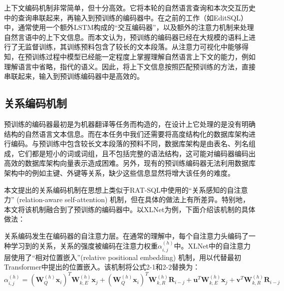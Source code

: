 上下文编码机制非常简单，但十分高效。它将本轮的自然语言查询和本次交互历史中的查询串联起来，再输入到预训练的编码器中。在之前的工作（如EditSQL\cite{edit19}）中，通常使用一个额外LSTM构成的“交互编码器”，以及额外的注意力机制来处理自然言语中的上下文信息。而本文认为，预训练的编码器已经在大规模的语料上进行了无监督训练，其训练预料包含了较长的文本段落。从注意力可视化\cite{attn17}中能够得知，在预训练过程中模型已经能一定程度上掌握理解自然语言上下文的能力，例如理解语言中省略，指代的语义。因此，将上下文信息按照匹配预训练的方法，直接串联起来，输入到预训练编码器中是高效的。

\subsection{关系编码机制}

预训练的编码器最初是为机器翻译等任务而构造的，在设计上它处理的是没有明确结构的自然语言文本信息。而在本任务中我们还需要将高度结构化的数据库架构进行编码。与预训练中包含较长文本段落的预料不同，数据库架构是由表名、列名组成，它们都是短小的词或词组，且不包括完整的语法结构，这可能对编码器编码出高效的数据库架构向量表示造成困难。另外，现有的预训练编码器无法利用数据库架构中的例如主键、外键等关系，缺少这些信息显然将增大该任务的难度。

本文提出的关系编码机制在思想上类似于RAT-SQL\cite{ratsql19}中使用的“关系感知的自注意力” (relation-aware self-attention) 机制，但在具体的做法上有所差异。特别地，本文将该机制融合到了预训练的编码器中。以XLNet为例，下面介绍该机制的具体做法：

关系编码发生在编码器的自注意力层。在通常的理解中，每个自注意力头编码了一种学习到的关系，关系的强度被编码在注意力权重$\alpha_{i,j}^{\left(h\right)}$中。XLNet中的自注意力层使用了“相对位置嵌入”(relative positional embedding) 机制，用以代替最初Transformer中提出的位置嵌入。该机制将公式2-1和2-2替换为：
\begin{equation}
    \alpha_{i,j}^{(h)}=
        \left(\bm{W}_Q^{(h)}\bm{x}_i\right)^T\bm{W}_{k,E}^{(h)}\bm{x}_j+
        \left(\bm{W}_Q^{(h)}\bm{x}_i\right)^T\bm{W}_{k,R}^{(h)}\bm{R}_{i-j}+
        \bm{u}^T\bm{W}_{k,E}^{(h)}\bm{x}_j+
        \bm{v}^T\bm{W}_{k,R}^{(h)}\bm{R}_{i-j}
\end{equation}

